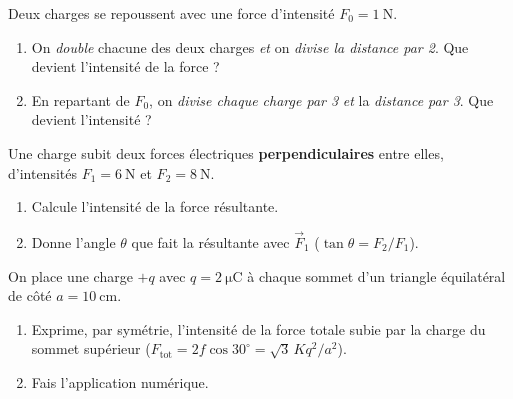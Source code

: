 \documentclass[11pt,a4paper]{article}
\newcommand{\vv}[1]{\vec{#1}}\newcommand{\ds}{\displaystyle}
\begin{document}

\begin{exo}
Deux charges se repoussent avec une force d'intensité $F_0 = \SI{1}{\newton}$.
\begin{enumerate}[label=\alph*)]
  \item On \emph{double} chacune des deux charges \emph{et} on \emph{divise la distance par 2}.
        Que devient l'intensité de la force ?
  \item En repartant de $F_0$, on \emph{divise chaque charge par 3} \emph{et} la \emph{distance par
        3}. Que devient l'intensité ?
\end{enumerate}
\end{exo}

\begin{exo}
Une charge subit deux forces électriques \textbf{perpendiculaires} entre elles, d'intensités
$F_1 = \SI{6}{\newton}$ et $F_2 = \SI{8}{\newton}$.
\begin{enumerate}[label=\alph*)]
  \item Calcule l'intensité de la force résultante.
  \item Donne l'angle $\theta$ que fait la résultante avec $\vv{F}_1$ ($\tan\theta = F_2/F_1$).
\end{enumerate}
\end{exo}

\begin{exo}
On place une charge $+q$ avec $q = \SI{2}{\micro\coulomb}$ à chaque sommet d'un triangle
équilatéral de côté $a = \SI{10}{\centi\metre}$.
\begin{center}
\end{center}
\begin{enumerate}[label=\alph*)]
  \item Exprime, par symétrie, l'intensité de la force totale subie par la charge du sommet
        supérieur ($F_{\text{tot}} = 2f\cos 30^\circ = \sqrt{3}\,K q^2/a^2$).
  \item Fais l'application numérique.
\end{enumerate}
\end{exo}
\end{document}
